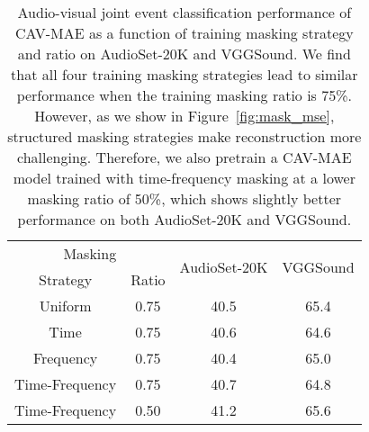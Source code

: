 \documentclass{article} \usepackage{iclr2023_conference,times}
\begin{document}
\begin{table}[h]
\centering
\caption{Audio-visual joint event classification performance of CAV-MAE as a function of training masking strategy and ratio on AudioSet-20K and VGGSound. We find that all four training masking strategies lead to similar performance when the training masking ratio is 75\%. However, as we show in Figure~\ref{fig:mask_mse}, structured masking strategies make reconstruction more challenging. Therefore, we also pretrain a CAV-MAE model trained with time-frequency masking at a lower masking ratio of 50\%, which shows slightly better performance on both AudioSet-20K and VGGSound.}
\label{tab:mask_method}
\begin{tabular}{@{}cccc@{}}
\toprule
\multicolumn{2}{c}{Masking} & \multirow{2}{*}{AudioSet-20K} & \multirow{2}{*}{VGGSound} \\ \cmidrule(r){1-2}
Strategy          & Ratio   &                               &                           \\ \midrule
Uniform           & 0.75    & 40.5                          & 65.4                      \\
Time              & 0.75    & 40.6                          & 64.6                      \\
Frequency         & 0.75    & 40.4                          & 65.0                      \\
Time-Frequency    & 0.75    & 40.7                          & 64.8                      \\
Time-Frequency    & 0.50    & 41.2                          & 65.6                         \\ \bottomrule
\end{tabular}
\end{table}
\end{document}
